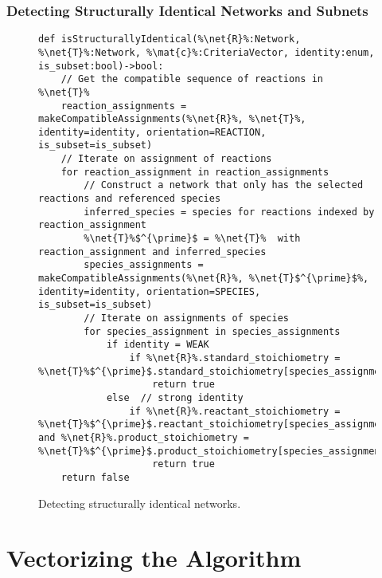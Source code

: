 \documentclass{article}
\newcommand{\mat}[1]{${\bf #1}$} %
\newcommand{\net}[1]{$\mathcal{#1}$} %
\begin{document}
\subsubsection{Detecting Structurally Identical Networks and Subnets}
\begin{figure}
\begin{lstlisting}[mathescape=true,escapechar=\%]
def isStructurallyIdentical(%\net{R}%:Network, %\net{T}%:Network, %\mat{c}%:CriteriaVector, identity:enum, is_subset:bool)->bool:
    // Get the compatible sequence of reactions in %\net{T}%
    reaction_assignments = makeCompatibleAssignments(%\net{R}%, %\net{T}%, identity=identity, orientation=REACTION, is_subset=is_subset)
    // Iterate on assignment of reactions
    for reaction_assignment in reaction_assignments
        // Construct a network that only has the selected reactions and referenced species
        inferred_species = species for reactions indexed by reaction_assignment
        %\net{T}%$^{\prime}$ = %\net{T}%  with reaction_assignment and inferred_species
        species_assignments = makeCompatibleAssignments(%\net{R}%, %\net{T}$^{\prime}$%, identity=identity, orientation=SPECIES, is_subset=is_subset)
        // Iterate on assignments of species
        for species_assignment in species_assignments
            if identity = WEAK
                if %\net{R}%.standard_stoichiometry = %\net{T}%$^{\prime}$.standard_stoichiometry[species_assignment]
                    return true
            else  // strong identity
                if %\net{R}%.reactant_stoichiometry = %\net{T}%$^{\prime}$.reactant_stoichiometry[species_assignmen] and %\net{R}%.product_stoichiometry = %\net{T}%$^{\prime}$.product_stoichiometry[species_assignment]
                    return true
    return false
\end{lstlisting}
\caption{Detecting structurally identical networks.}\label{alg:isStructurallyIdentical}
\end{figure}

\section{Vectorizing the Algorithm}
\end{document}
